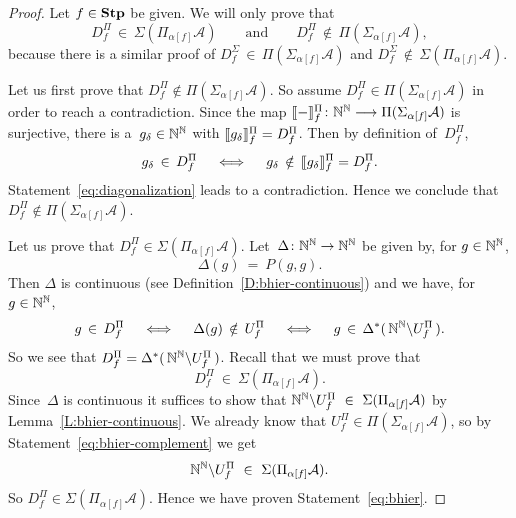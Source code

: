 \begin{proof}
Let $f\in\mathbf{Stp}$ be given.
We will only prove 
that
\begin{equation}
\label{eq:bhier}
D^\Pi_f \,\in\, \Sigma(\Pi_{\alpha[f]} \mathcal{A})
\qquad\text{and}\qquad
D^\Pi_f \,\notin\, \Pi(\Sigma_{\alpha[f]} \mathcal{A}),
\end{equation}
because there is a similar proof of
$D^\Sigma_f \,\in\, \Pi(\Sigma_{\alpha[f]} \mathcal{A})$
and
$D^\Sigma_f \,\notin\, \Sigma(\Pi_{\alpha[f]} \mathcal{A})$.

Let us first prove that 
$D^\Pi_f\notin  \Pi(\Sigma_{\alpha[f]}\mathcal{A})$.
So assume 
$D^\Pi_f\in \Pi(\Sigma_{\alpha[f]}\mathcal{A})$
in order to reach a contradiction.
Since the map $\decode{-}^\Pi_f\colon \N^\N \longrightarrow \Pi(\Sigma_{\alpha[f]}\mathcal{A})$
is surjective,
there is a~$g_\delta \in \mathbb{N}^{\mathbb{N}}$
with $\decode{g_\delta}^\Pi_f = D^\Pi_f$.
Then
by definition of~$D^\Pi_f$,
\begin{equation}
\label{eq:diagonalization}
g_\delta \,\in\, D^\Pi_f
\quad\iff\quad
g_\delta \,\notin\, \decode{g_\delta}^\Pi_f = D^\Pi_f.
\end{equation}
Statement~\eqref{eq:diagonalization}
leads to a contradiction.
Hence we conclude that $D^\Pi_f\notin \Pi(\Sigma_{\alpha[f]}\mathcal{A})$.

Let us prove that $D^\Pi_f \in \Sigma (\Pi_{\alpha[f]}\mathcal{A})$.
Let~$\Delta\colon \mathbb{N}^{\mathbb{N}} \rightarrow \mathbb{N}^{\mathbb{N}}$
be given by, for $g\in \mathbb{N}^{\mathbb{N}}$,
\begin{equation*}
\Delta(g) \ =\  P(g,g).
\end{equation*}
Then $\Delta$ is continuous
(see Definition~\ref{D:bhier-continuous})
and we have, for $g\in \mathbb{N}^{\mathbb{N}}$,
\begin{equation*}
g\,\in\, D^\Pi_f 
\quad\iff\quad
\Delta(g) \,\notin\, U^\Pi_f
\quad\iff\quad
g\,\in\,\Delta^*(\,\mathbb{N}^{\mathbb{N}} \backslash U^\Pi_f \,).
\end{equation*}
So we see that $D^\Pi_f = \Delta^*(\,\mathbb{N}^{\mathbb{N}}\backslash U_f^\Pi\,)$.
Recall that we must prove that
\begin{equation*}
D^\Pi_f \ \in\  \Sigma (\Pi_{\alpha[f]}\mathcal{A}).
\end{equation*}
Since~$\Delta$
is continuous
it suffices to show that 
$\mathbb{N}^{\mathbb{N}}\backslash U_f^\Pi \ \in\  \Sigma (\Pi_{\alpha[f]}\mathcal{A})$
by Lemma~\ref{L:bhier-continuous}.
We already know that $U^\Pi_f \in \Pi(\Sigma_{\alpha[f]} \mathcal{A})$,
so 
by Statement~\eqref{eq:bhier-complement}
we get
\begin{equation*}
\N^\N\backslash U^\Pi_f \ \in\  \Sigma(\Pi_{\alpha[f]} \mathcal{A}).
\end{equation*}
So
$D^\Pi_f \in \Sigma (\Pi_{\alpha[f]}\mathcal{A})$.
Hence we have proven Statement~\eqref{eq:bhier}.
\end{proof}

